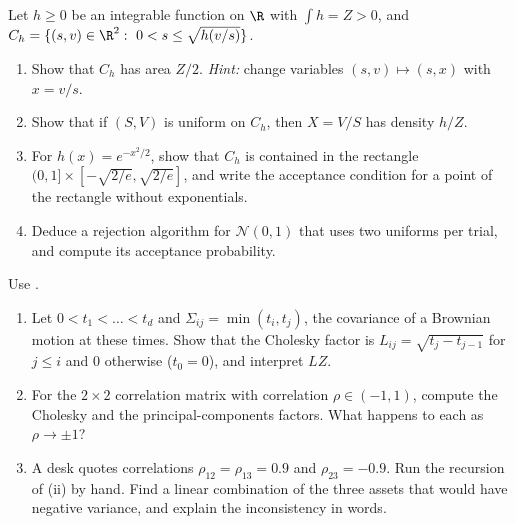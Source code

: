 \begin{exercise}\label{ex:rng-ratio-uniforms}
\hard Let $h\ge0$ be an integrable function on $\R$ with $\int h=Z>0$, and
$C_h=\{(s,v)\in\R^2:\ 0<s\le\sqrt{h(v/s)}\}$.
\begin{enumerate}[label=(\alph*)]
  \item Show that $C_h$ has area $Z/2$. \emph{Hint:} change variables $(s,v)\mapsto(s,x)$
    with $x=v/s$.
  \item Show that if $(S,V)$ is uniform on $C_h$, then $X=V/S$ has density $h/Z$.
  \item For $h(x)=e^{-x^2/2}$, show that $C_h$ is contained in the rectangle
    $(0,1]\times[-\sqrt{2/e},\sqrt{2/e}]$, and write the acceptance condition for a point
    of the rectangle without exponentials.
  \item Deduce a rejection algorithm for $\mathcal N(0,1)$ that uses two uniforms per trial,
    and compute its acceptance probability.
\end{enumerate}
\end{exercise}

\begin{exercise}\label{ex:rng-cholesky}
\easy Use .
\begin{enumerate}[label=(\alph*)]
  \item Let $0<t_1<\dots<t_d$ and $\Sigma_{ij}=\min(t_i,t_j)$, the covariance of a Brownian
    motion at these times. Show that the Cholesky factor is $L_{ij}=\sqrt{t_j-t_{j-1}}$ for
    $j\le i$ and $0$ otherwise ($t_0=0$), and interpret $LZ$.
  \item For the $2\times2$ correlation matrix with correlation $\rho\in(-1,1)$, compute the
    Cholesky and the principal-components factors. What happens to each as $\rho\to\pm1$?
  \item A desk quotes correlations $\rho_{12}=\rho_{13}=0.9$ and $\rho_{23}=-0.9$. Run the
    recursion of (ii) by hand. Find a linear combination of the
    three assets that would have negative variance, and explain the inconsistency in
    words.
\end{enumerate}
\end{exercise}

